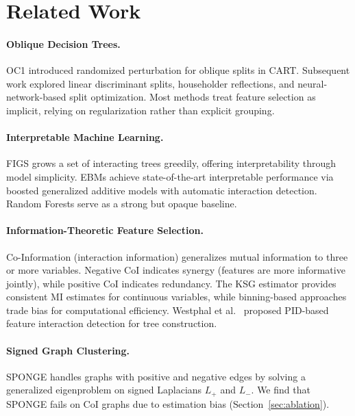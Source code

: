 \documentclass[11pt,letterpaper]{article}
\begin{document}
\section{Related Work}

\paragraph{Oblique Decision Trees.}
OC1 \citep{Murthy1994} introduced randomized perturbation for oblique splits in CART.
Subsequent work explored linear discriminant splits, householder reflections, and neural-network-based split optimization.
Most methods treat feature selection as implicit, relying on regularization rather than explicit grouping.

\paragraph{Interpretable Machine Learning.}
FIGS \citep{Tan2022} grows a set of interacting trees greedily, offering interpretability through model simplicity.
EBMs \citep{Lou2013, Nori2019} achieve state-of-the-art interpretable performance via boosted generalized additive models with automatic interaction detection.
Random Forests \citep{Breiman2001} serve as a strong but opaque baseline.

\paragraph{Information-Theoretic Feature Selection.}
Co-Information (interaction information) \citep{McGill1954} generalizes mutual information to three or more variables.
Negative CoI indicates synergy (features are more informative jointly), while positive CoI indicates redundancy.
The KSG estimator \citep{Kraskov2004} provides consistent MI estimates for continuous variables, while binning-based approaches trade bias for computational efficiency.
Westphal et al.~\citep{Westphal2025} proposed PID-based feature interaction detection for tree construction.

\paragraph{Signed Graph Clustering.}
SPONGE \citep{Cucuringu2020} handles graphs with positive and negative edges by solving a generalized eigenproblem on signed Laplacians $L_{+}$ and $L_{-}$.
We find that SPONGE fails on CoI graphs due to estimation bias (Section~\ref{sec:ablation}).
\end{document}
